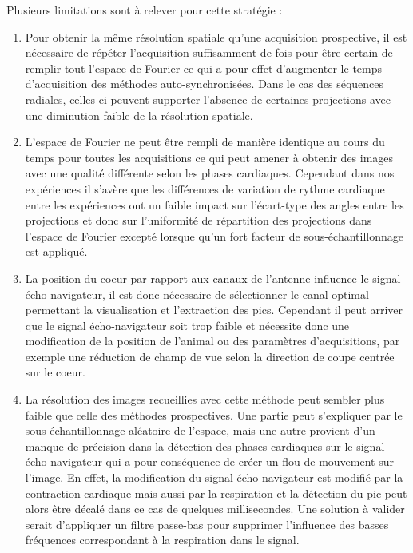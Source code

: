 Plusieurs limitations sont à relever pour cette stratégie :
\begin{enumerate}
\item Pour obtenir la même résolution spatiale qu'une acquisition prospective, il est nécessaire de répéter l'acquisition suffisamment de fois pour être certain de remplir tout l'espace de Fourier ce qui a pour effet d'augmenter le temps d'acquisition des méthodes auto-synchronisées. Dans le cas des séquences radiales, celles-ci peuvent supporter l'absence de certaines projections avec une diminution faible de la résolution spatiale.

\item L'espace de Fourier ne peut être rempli de manière identique au cours du temps pour toutes les acquisitions ce qui peut amener à obtenir des images avec une qualité différente selon les phases cardiaques. Cependant dans nos expériences il s'avère que les différences de variation de rythme cardiaque entre les expériences ont un faible impact sur l'écart-type des angles entre les projections et donc sur l'uniformité de répartition des projections dans l'espace de Fourier excepté lorsque qu'un fort facteur de sous-échantillonnage est appliqué.

\item La position du coeur par rapport aux canaux de l'antenne influence le signal écho-navigateur, il est donc nécessaire de sélectionner le canal optimal permettant la visualisation et l'extraction des pics. Cependant il peut arriver que le signal écho-navigateur soit trop faible et nécessite donc une modification de la position de l'animal ou des paramètres d'acquisitions, par exemple une réduction de champ de vue selon la direction de coupe centrée sur le coeur.

\item La résolution des images recueillies avec cette méthode peut sembler plus faible que celle des méthodes prospectives. Une partie peut s'expliquer par le sous-échantillonnage aléatoire de l'espace, mais une autre provient d'un manque de précision dans la détection des phases cardiaques sur le signal écho-navigateur qui a pour conséquence de créer un flou de mouvement sur l'image. En effet, la modification du signal écho-navigateur est modifié par la contraction cardiaque mais aussi par la respiration et la détection du pic peut alors être décalé dans ce cas de quelques millisecondes. Une solution à valider serait d'appliquer un filtre passe-bas pour supprimer l'influence des basses fréquences correspondant à la respiration dans le signal.
\end{enumerate} 

